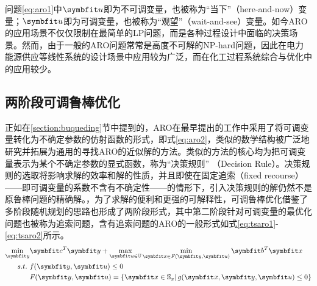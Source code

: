 问题\eqref{eq:aro1}中$\symbfit u$即为不可调变量，也被称为“当下”（here-and-now）变量；$\symbfit u$即为可调变量，也被称为“观望”（wait-and-see）变量\cite{bental2004}。如今ARO的应用场景不仅仅限制在最简单的LP问题，而是各种过程设计中面临的决策场景。然而，由于一般的ARO问题常常是高度不可解的NP-hard问题，因此在电力能源供应等线性系统的设计场景中应用较为广泛\cite{zugno2016,moreira2015, zhang2016, nan2023}，而在化工过程系统综合与优化中的应用较少。

\subsection{两阶段可调鲁棒优化}

正如在\ref{section:buqueding}节中提到的，ARO在最早提出的工作中采用了将可调变量转化为不确定参数的仿射函数的形式，即式\eqref{eq:aro2}，类似的数学结构被广泛地研究并拓展为通用的寻找ARO的近似解的方法。类似的方法的核心均为把可调变量表示为某个不确定参数的显式函数，称为“决策规则” （Decision Rule）。决策规则的选取将影响求解的效率和解的性质，并且即使在固定追索（fixed recourse）——即可调变量的系数不含有不确定性——的情形下，引入决策规则的解仍然不是原鲁棒问题的精确解。，为了求解的便利和更强的可解释性，可调鲁棒优化借鉴了多阶段随机规划的思路也形成了两阶段形式，其中第二阶段针对可调变量的最优化问题也被称为追索问题，含有追索问题的ARO的一般形式如式\eqref{eq:tsaro1}-\eqref{eq:tsaro2}所示。
 \begin{align}
   \min_{\symbfit y} &\symbfit c^T\symbfit y + \max_{\symbfit u\in\mathbb U} \min_{\symbfit x\in \mathit F(\symbfit y, \symbfit u)} \symbfit b^T \symbfit x \label{eq:tsaro1}\\
    s.t.\ & f(\symbfit y,\symbfit u) \le 0 \\
    & \mathit F(\symbfit y, \symbfit u) = \left\{ \symbfit x\in \mathbb S_x\right | g(\symbfit x, \symbfit y, \symbfit u) \le 0\} \label{eq:tsaro2}
 \end{align}

